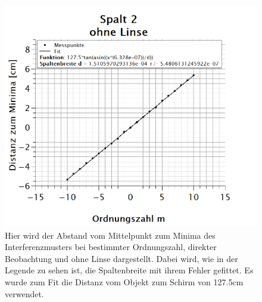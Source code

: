 \begin{figure}[h]
\centering
\includegraphics[width=\textwidth]{Bilder/spalt2_ohneLinse.png}
\vspace*{-1cm}
\caption[Spalt 2: ohne Linse]{Hier wird der Abstand vom Mittelpunkt zum Minima des Interferenzmusters bei bestimmter Ordnungszahl, direkter Beobachtung und ohne Linse dargestellt. Dabei wird, wie in der Legende zu sehen ist, die Spaltenbreite mit ihrem Fehler gefittet. Es wurde zum Fit die Distanz vom Objekt zum Schirm von 127.5cm verwendet.}
\label{fig:spalt2_ohneLinse}
\end{figure}
\newpage

